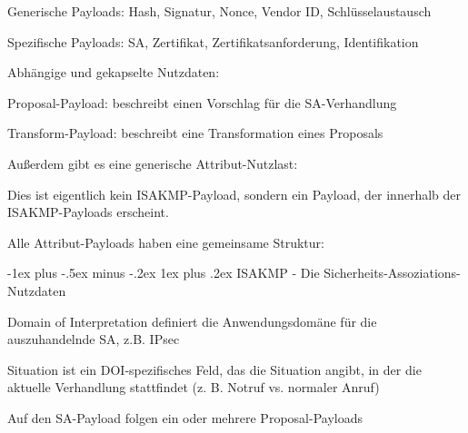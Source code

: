 \documentclass[a4paper]{article}
\makeatletter
\renewcommand{\subsubsection}{\@startsection{subsubsection}{3}{0mm}%
 {-1ex plus -.5ex minus -.2ex}%
 {1ex plus .2ex}%
 {\normalfont\small\bfseries}}
\makeatother
\begin{document}
\begin{multicols}{3}
\begin{itemize*}
            \begin{itemize*}
                  \item Generische Payloads: Hash, Signatur, Nonce, Vendor ID, Schlüsselaustausch
                  \item Spezifische Payloads: SA, Zertifikat, Zertifikatsanforderung, Identifikation
                  \item Abhängige und gekapselte Nutzdaten:
                  \begin{itemize*} \item Proposal-Payload: beschreibt einen Vorschlag für die SA-Verhandlung \item Transform-Payload: beschreibt eine Transformation eines Proposals \end{itemize*}
                  \item Außerdem gibt es eine generische Attribut-Nutzlast:
                  \begin{itemize*} \item Dies ist eigentlich kein ISAKMP-Payload, sondern ein Payload, der innerhalb der ISAKMP-Payloads erscheint. \item Alle Attribut-Payloads haben eine gemeinsame Struktur: %
                  \end{itemize*}
            \end{itemize*}


            \subsubsection{ISAKMP - Die
                  Sicherheits-Assoziations-Nutzdaten}

            \begin{itemize*}
                  \item
                  Domain of Interpretation definiert die Anwendungsdomäne für die
                  auszuhandelnde SA, z.B. IPsec
                  \item
                  Situation ist ein DOI-spezifisches Feld, das die Situation angibt, in
                  der die aktuelle Verhandlung stattfindet (z. B. Notruf vs. normaler
                  Anruf)
                  \item
                  Auf den SA-Payload folgen ein oder mehrere Proposal-Payloads
            \end{itemize*}



\end{itemize*}
\end{multicols}
\end{document}
